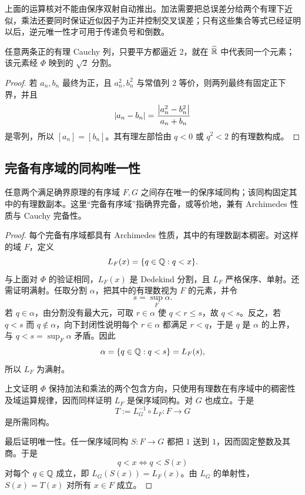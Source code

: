 上面的运算核对不能由保序双射自动推出。加法需要把总误差分给两个有理下近似，乘法还要同时保证近似因子为正并控制交叉误差；只有这些集合等式已经证明以后，逆元唯一性才可用于传递负号和倒数。

\begin{corollary}
任意两条正的有理 Cauchy 列，只要平方都逼近 \(2\)，就在 \(\widehat{\mathbb{R}}\) 中代表同一个元素；该元素经 \(\Phi\) 映到的 \(\sqrt2\) 分割。
\end{corollary}

\begin{proof}
若 \(a_n,b_n\) 最终为正，且 \(a_n^2,b_n^2\) 与常值列 \(2\) 等价，则两列最终有固定正下界，并且
\[
 \left|a_n-b_n\right|
 =\frac{\left|a_n^2-b_n^2\right|}{a_n+b_n}
\]
是零列，所以 \([a_n]=[b_n]\)。其有理左部恰由 \(q<0\) 或 \(q^2<2\) 的有理数构成。
\end{proof}

\subsection{完备有序域的同构唯一性}


\begin{theorem}
任意两个满足确界原理的有序域 \(F,G\) 之间存在唯一的保序域同构；该同构固定其中的有理数副本。这里“完备有序域”指确界完备，或等价地，兼有 Archimedes 性质与 Cauchy 完备性。
\end{theorem}

\begin{proof}
每个完备有序域都具有 Archimedes 性质，其中的有理数副本稠密。对这样的域 \(F\)，定义
\[
 L_F(x)=\{q\in\mathbb{Q}:q<x\}.
\]
与上面对 \(\Phi\) 的验证相同，\(L_F(x)\) 是 Dedekind 分割，且 \(L_F\) 严格保序、单射。还需证明满射。任取分割 \(\alpha\)，把其中的有理数视为 \(F\) 的元素，并令
\[
 s=\sup_F\alpha.
\]
若 \(q\in\alpha\)，由分割没有最大元，可取 \(r\in\alpha\) 使 \(q<r\le s\)，故 \(q<s\)。反之，若 \(q<s\) 而 \(q\notin\alpha\)，向下封闭性说明每个 \(r\in\alpha\) 都满足 \(r<q\)，于是 \(q\) 是 \(\alpha\) 的上界，与 \(q<s=\sup_F\alpha\) 矛盾。因此
\[
 \alpha=\{q\in\mathbb{Q}:q<s\}=L_F(s),
\]
所以 \(L_F\) 为满射。

上文证明 \(\Phi\) 保持加法和乘法的两个包含方向，只使用有理数在有序域中的稠密性及域运算规律，因而同样证明 \(L_F\) 是保序域同构。对 \(G\) 也成立。于是
\[
 T:=L_G^{-1}\circ L_F:F\longrightarrow G
\]
是所需同构。

最后证明唯一性。任一保序域同构 \(S:F\to G\) 都把 \(1\) 送到 \(1\)，因而固定整数及其商。于是
\[
 q<x\Longleftrightarrow q<S(x)
\]
对每个 \(q\in\mathbb{Q}\) 成立，即 \(L_G(S(x))=L_F(x)\)。由 \(L_G\) 的单射性，\(S(x)=T(x)\) 对所有 \(x\in F\) 成立。
\end{proof}

